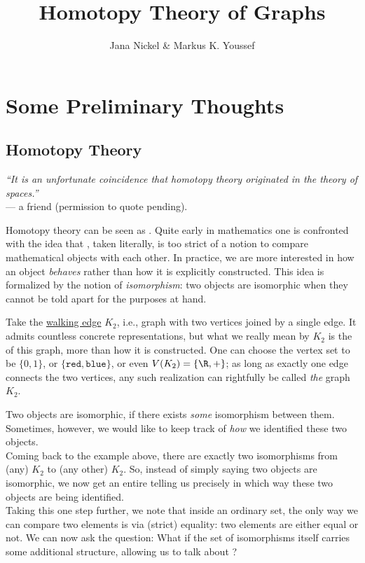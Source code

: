 \documentclass[11pt,a4paper]{article}
\title{Homotopy Theory of Graphs}
\author{Jana Nickel \& Markus K. Youssef}
\date{}
\begin{document}
\maketitle

\section{Some Preliminary Thoughts}
\subsection{Homotopy Theory}
\begin{flushright}
  \emph{“It is an unfortunate coincidence that homotopy theory originated in the theory of spaces.”}\\
  — a friend (permission to quote pending). 
\end{flushright}
Homotopy theory can be seen as . Quite early in mathematics one is confronted with the idea that , taken literally, is too strict of a notion to compare mathematical objects with each other. In practice, we are more interested in how an object \emph{behaves} rather than how it is explicitly constructed. This idea is formalized by the notion of \emph{isomorphism}: two objects are isomorphic when they cannot be told apart for the purposes at hand.
\begin{example}
    Take the \href{https://ncatlab.org/nlab/show/walking+structur}{walking edge} $K_2$, i.e.,  graph with two vertices joined by a single edge. It admits countless concrete representations, but what we really mean by $K_2$ is the  of this graph, more than how it is constructed. One can choose the vertex set to be $\{0, 1 \}$, or $\{\texttt{red}, \texttt{blue}\}$, or even $V(K_2) = \{\R, + \}$; as long as exactly one edge connects the two vertices, any such realization can rightfully be called \emph{the} graph $K_2$.
\end{example}
Two objects are isomorphic, if there exists \emph{some} isomorphism between them. Sometimes, however, we would like to keep track of \emph{how} we identified these two objects.\\
Coming back to the example above, there are exactly two isomorphisms from (any) $K_2$ to (any other) $K_2$. So, instead of simply saying two objects are isomorphic, we now get an entire  telling us precisely in which way these two objects are being identified. \\
Taking this one step further, we note that inside an ordinary set, the only way we can compare two elements is via (strict) equality: two elements are either equal or not. We can now ask the question: What if the set of isomorphisms itself carries some additional structure, allowing us to talk about ? \\
\end{document}
